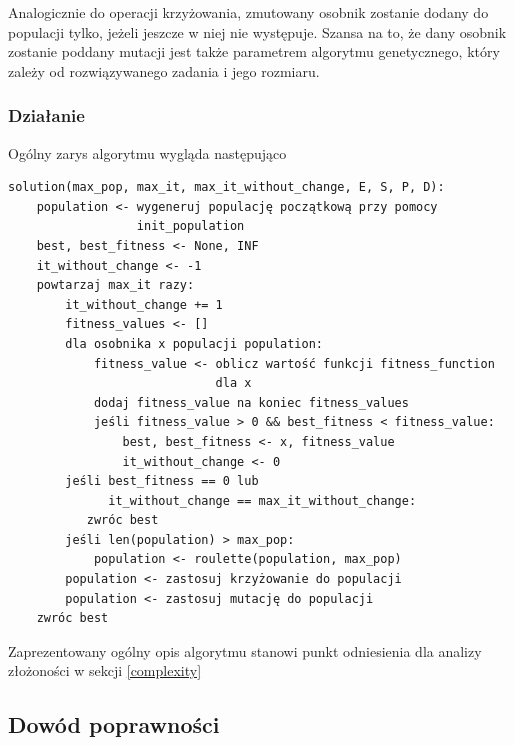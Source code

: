 \documentclass[12pt,a4paper]{article}
\theoremstyle{definition}
\begin{document}
\vspace{0.5em}
\noindent
 Analogicznie do operacji krzyżowania, zmutowany osobnik zostanie dodany do populacji tylko, jeżeli jeszcze w niej nie występuje. Szansa na to, że dany osobnik zostanie poddany mutacji jest także parametrem algorytmu genetycznego, który zależy od rozwiązywanego zadania i jego rozmiaru.

\subsubsection{Działanie}
Ogólny zarys algorytmu wygląda następująco
\begin{tcolorbox}[title=Pseudokod algorytmu]
\begin{verbatim}
solution(max_pop, max_it, max_it_without_change, E, S, P, D):
    population <- wygeneruj populację początkową przy pomocy 
                  init_population
    best, best_fitness <- None, INF
    it_without_change <- -1
    powtarzaj max_it razy:
        it_without_change += 1
        fitness_values <- []
        dla osobnika x populacji population:
            fitness_value <- oblicz wartość funkcji fitness_function 
                             dla x
            dodaj fitness_value na koniec fitness_values
            jeśli fitness_value > 0 && best_fitness < fitness_value:
                best, best_fitness <- x, fitness_value
                it_without_change <- 0
        jeśli best_fitness == 0 lub 
              it_without_change == max_it_without_change:
           zwróc best
        jeśli len(population) > max_pop:
            population <- roulette(population, max_pop)
        population <- zastosuj krzyżowanie do populacji
        population <- zastosuj mutację do populacji
    zwróc best
\end{verbatim}
\end{tcolorbox}
\noindent
Zaprezentowany ogólny opis algorytmu stanowi punkt odniesienia dla analizy złożoności w sekcji \ref{complexity}

\subsection{Dowód poprawności}
\label{subsec:correctnessintervals}
\end{document}
